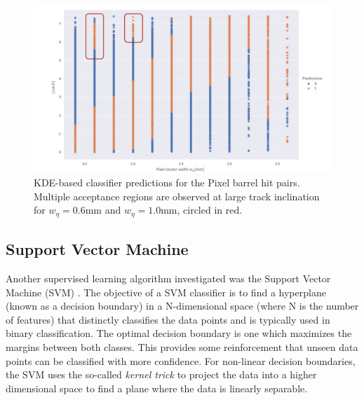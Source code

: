 \begin{figure}[!htbp]
\centering
\includegraphics[width=0.9\linewidth]{images/4-ml-based-predictor/Multiple_acceptance_regions.pdf}
\caption{KDE-based classifier predictions for the Pixel barrel hit pairs. Multiple acceptance regions are observed at large track inclination for $w_{\eta} = 0.6$mm and $w_{\eta} = 1.0$mm, circled in red.}
\label{fig:multiple-acceptance}
\end{figure}


\subsection{Support Vector Machine}


Another supervised learning algorithm investigated was the Support Vector Machine (SVM) \cite{svm}. The objective of a SVM classifier is to find a hyperplane (known as a decision boundary) in a N-dimensional space (where N is the number of features) that distinctly classifies the data points and is typically used in binary classification. The optimal decision boundary is one which maximizes the margins between both classes. This provides some reinforcement that unseen data points can be classified with more confidence. For non-linear decision boundaries, the SVM uses the so-called \textit{kernel trick} to project the data into a higher dimensional space to find a plane where the data is linearly separable. 


